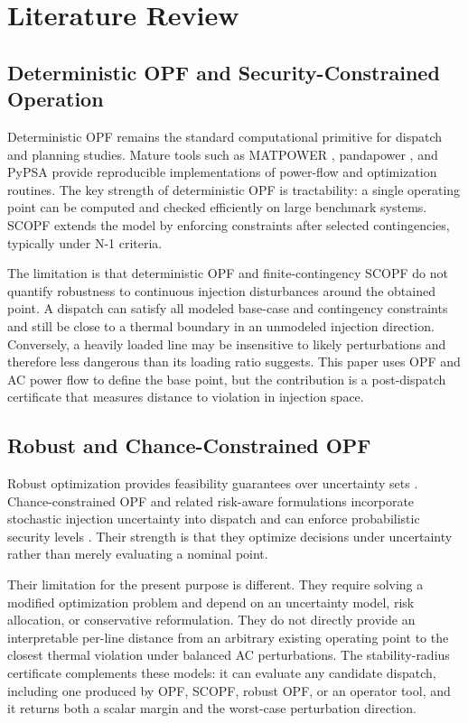 \documentclass[energies,article,submit,pdftex,moreauthors]{Definitions/mdpi}
\begin{document}
\section{Literature Review}
\label{sec:literature}

\subsection{Deterministic OPF and Security-Constrained Operation}

Deterministic OPF remains the standard computational primitive for dispatch and planning studies. Mature tools such as MATPOWER \citep{ZimmermanMurilloSanchezThomas2011}, pandapower \citep{ThurnerEtAl2018}, and PyPSA \citep{BrownHorschSchlachtberger2018} provide reproducible implementations of power-flow and optimization routines. The key strength of deterministic OPF is tractability: a single operating point can be computed and checked efficiently on large benchmark systems. SCOPF extends the model by enforcing constraints after selected contingencies, typically under N-1 criteria.

The limitation is that deterministic OPF and finite-contingency SCOPF do not quantify robustness to continuous injection disturbances around the obtained point. A dispatch can satisfy all modeled base-case and contingency constraints and still be close to a thermal boundary in an unmodeled injection direction. Conversely, a heavily loaded line may be insensitive to likely perturbations and therefore less dangerous than its loading ratio suggests. This paper uses OPF and AC power flow to define the base point, but the contribution is a post-dispatch certificate that measures distance to violation in injection space.

\subsection{Robust and Chance-Constrained OPF}

Robust optimization provides feasibility guarantees over uncertainty sets \citep{BenTalNemirovski1998,BertsimasSim2004}. Chance-constrained OPF and related risk-aware formulations incorporate stochastic injection uncertainty into dispatch and can enforce probabilistic security levels \citep{BienstockChertkovHarnett2014,RoaldEtAl2016,LubinBackhausDvorkin2016}. Their strength is that they optimize decisions under uncertainty rather than merely evaluating a nominal point.

Their limitation for the present purpose is different. They require solving a modified optimization problem and depend on an uncertainty model, risk allocation, or conservative reformulation. They do not directly provide an interpretable per-line distance from an arbitrary existing operating point to the closest thermal violation under balanced AC perturbations. The stability-radius certificate complements these models: it can evaluate any candidate dispatch, including one produced by OPF, SCOPF, robust OPF, or an operator tool, and it returns both a scalar margin and the worst-case perturbation direction.
\end{document}
